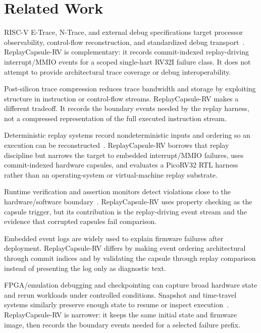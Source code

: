 \section{Related Work}

RISC-V E-Trace, N-Trace, and external debug specifications target processor observability, control-flow reconstruction, and standardized debug transport~\cite{riscvTrace,riscvDebug}. ReplayCapsule-RV is complementary: it records commit-indexed replay-driving interrupt/MMIO events for a scoped single-hart RV32I failure class. It does not attempt to provide architectural trace coverage or debug interoperability.

Post-silicon trace compression reduces trace bandwidth and storage by exploiting structure in instruction or control-flow streams. ReplayCapsule-RV makes a different tradeoff. It records the boundary events needed by the replay harness, not a compressed representation of the full executed instruction stream.

Deterministic replay systems record nondeterministic inputs and ordering so an execution can be reconstructed~\cite{leblanc1987debugging,dunlap2002revirt}. ReplayCapsule-RV borrows that replay discipline but narrows the target to embedded interrupt/MMIO failures, uses commit-indexed hardware capsules, and evaluates a PicoRV32 RTL harness rather than an operating-system or virtual-machine replay substrate.

Runtime verification and assertion monitors detect violations close to the hardware/software boundary~\cite{runtimeVerification}. ReplayCapsule-RV uses property checking as the capsule trigger, but its contribution is the replay-driving event stream and the evidence that corrupted capsules fail comparison.

Embedded event logs are widely used to explain firmware failures after deployment. ReplayCapsule-RV differs by making event ordering architectural through commit indices and by validating the capsule through replay comparison instead of presenting the log only as diagnostic text.

FPGA/emulation debugging and checkpointing can capture broad hardware state and rerun workloads under controlled conditions. Snapshot and time-travel systems similarly preserve enough state to resume or inspect execution~\cite{king2005debugging}. ReplayCapsule-RV is narrower: it keeps the same initial state and firmware image, then records the boundary events needed for a selected failure prefix.


